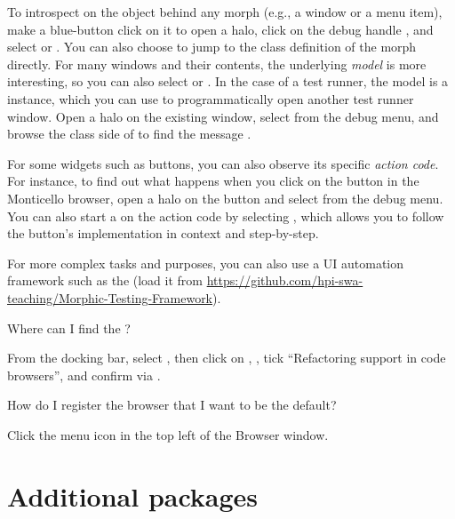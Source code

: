 \documentclass[a4paper,10pt,twoside]{book}
\begin{document}
{To introspect on the object behind any morph (e.g., a window or a menu item), make a blue-button click on it to open a halo, click on the debug handle \debugHandle{}, and select  or .
You can also choose  to jump to the class definition of the morph directly.
For many windows and their contents, the underlying \emph{model} is more interesting, so you can also select  or .
In the case of a test runner, the model is a  instance, which you can use to programmatically open another test runner window.
Open a halo on the existing window, select  from the debug menu, and browse the class side of  to find the message .

For some widgets such as buttons, you can also observe its specific \emph{action code}.
For instance, to find out what happens when you click on the  button in the Monticello browser, open a halo on the button and select  from the debug menu.
You can also start a  on the action code by selecting , which allows you to follow the button's implementation in context and step-by-step.

For more complex  tasks and  purposes, you can also use a UI automation framework such as the  (load it from \url{https://github.com/hpi-swa-teaching/Morphic-Testing-Framework}).

\begin{faq}
Where can I find the ?
\end{faq}
\answer
From the docking bar, select , then click on , , tick ``Refactoring support in code browsers'', and confirm via .

\begin{faq}
How do I register the browser that I want to be the default?
\end{faq}
\answer
Click the menu icon in the top left of the Browser window.

\section{Additional packages}

}
\end{document}
